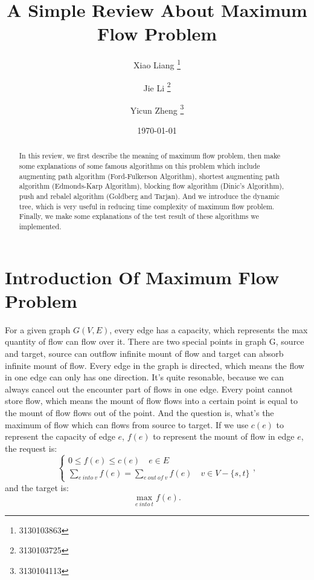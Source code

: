 \documentclass[twocolumn,9pt]{extarticle}
\begin{document}
\title{\textbf{A Simple Review About Maximum Flow Problem}}
\author{Xiao Liang \thanks{3130103863} \and Jie Li \thanks{3130103725} \and Yicun Zheng \thanks{3130104113}}
\date{\today}
\maketitle

\begin{abstract}
In this review, we first describe the meaning of maximum flow problem, then make some explanations of some famous algorithms on this problem which include augmenting path algorithm (Ford-Fulkerson Algorithm), shortest augmenting path algorithm (Edmonds-Karp Algorithm), blocking flow algorithm (Dinic's Algorithm), push and rebalel algorithm (Goldberg and Tarjan). And we introduce the dynamic tree, which is very useful in reducing time complexity of maximum flow problem. Finally, we make some explanations of the test result of these algorithms we implemented.
\end{abstract}


\section{Introduction Of Maximum Flow Problem}
For a given graph $G(V,E)$, every edge has a capacity, which represents the max quantity of flow can flow over it. There are two special points in graph G, source and target, source can outflow infinite mount of flow and target can absorb infinite mount of flow. Every edge in the graph is directed, which means the flow in one edge can only has one direction. It's quite resonable, because we can always cancel out the encounter part of flows in one edge. Every point cannot store flow, which means the mount of flow flows into a certain point is equal to the mount of flow flows out of the point. And the question is, what's the maximum of flow which can flows from source to target.
If we use $c(e)$ to represent the capacity of edge $e$, $f(e)$ to represent the mount of flow in edge $e$, the request is:
\begin{equation}
	\begin{cases}
		0 \leq f(e) \leq c(e) \quad e \in E \\
		\sum_{e\ into\ v}{f(e)} = \sum_{e\ out\ of\ v}{f(e)} \quad v \in V-\{s,t\}
	\end{cases},
\end{equation}
and the target is:
\begin{equation}
\max_{e\ into\ t}{f(e)}.
\end{equation}
\end{document}
